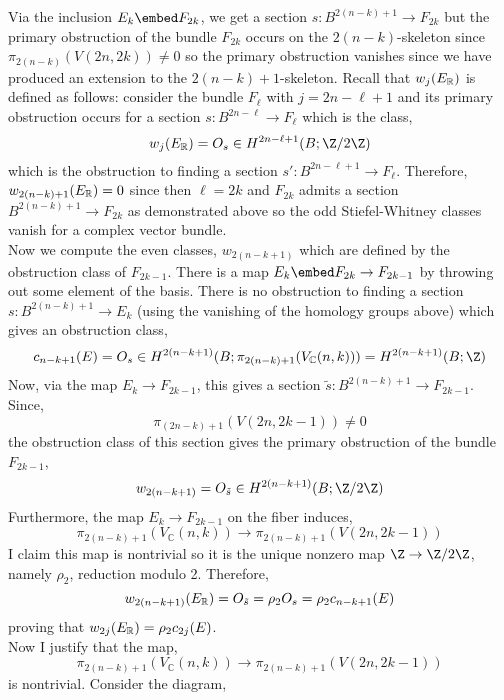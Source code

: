 \documentclass[12pt]{extarticle}
\newcommand{\C}{\mathbb{C}}
\begin{document}
Via the inclusion $E_k \embed F_{2k}$, we get a section $s : B^{2 (n - k) + 1} \to F_{2k}$ but the primary obstruction of the bundle $F_{2k}$ occurs on the $2(n - k)$-skeleton since $\pi_{2(n-k)}(V(2n, 2k)) \neq 0$ so the primary obstruction vanishes since we have produced an extension to the $2(n-k) + 1$-skeleton. Recall that $w_{j}(E_{\mathbb{R}})$ is defined as follows: consider the bundle $F_{\ell}$ with $j = 2n - \ell + 1$ and its primary obstruction occurs for a section $s : B^{2n-\ell} \to F_{\ell}$ which is the class,
\[ w_{j}(E_\R) = O_{s} \in H^{2n - \ell + 1}(B; \Z / 2 \Z) \]
which is the obstruction to finding a section $s' : B^{2n - \ell + 1} \to F_{\ell}$. Therefore, $w_{2(n - k) + 1}(E_{\mathbb{R}}) = 0$ since then $\ell = 2 k$ and $F_{2k}$ admits a section $B^{2(n - k) + 1} \to F_{2k}$ as demonstrated above so the odd Stiefel-Whitney classes vanish for a complex vector bundle.
\bigskip\\
Now we compute the even classes, $w_{2(n-k + 1)}$ which are defined by the obstruction class of $F_{2k - 1}$. There is a map $E_{k} \embed F_{2k} \to F_{2k - 1}$ by throwing out some element of the basis. There is no obstruction to finding a section $s : B^{2(n - k) + 1} \to E_k$ (using the vanishing of the homology groups above) which gives an obstruction class,
\[ c_{n-k+1}(E) = O_s \in H^{2(n - k + 1)}(B; \pi_{2(n-k) + 1}(V_\C(n, k))) = H^{2(n - k + 1)}(B; \Z) \]
Now, via the map $E_{k} \to F_{2k - 1}$, this gives a section $\tilde{s} : B^{2(n - k) + 1} \to F_{2k - 1}$. Since,
\[ \pi_{(2 n - k) + 1}(V(2n, 2k - 1)) \neq 0 \]
the obstruction class of this section gives the primary obstruction of the bundle $F_{2k - 1}$,
\[ w_{2(n - k + 1)} = O_{\tilde{s}} \in H^{2(n - k + 1)}(B; \Z / 2 \Z) \]
Furthermore, the map $E_k \to F_{2k - 1}$ on the fiber induces,
\[ \pi_{2(n - k) + 1}(V_\C(n, k)) \to \pi_{2(n - k) + 1}(V(2n, 2k - 1)) \]
I claim this map is nontrivial so it is the unique nonzero map $\Z \to \Z / 2 \Z$, namely $\rho_2$, reduction modulo 2. Therefore, 
\[ w_{2(n - k + 1)}(E_{\mathbb{R}}) = O_{\tilde{s}} = \rho_2 O_{s} = \rho_2 c_{n - k + 1}(E) \]
proving that $w_{2j}(E_{\mathbb{R}}) = \rho_2 c_{2j}(E)$. 
\bigskip\\
Now I justify that the map,
\[ \pi_{2(n - k) + 1}(V_\C(n, k)) \to \pi_{2(n - k) + 1}(V(2n, 2k - 1)) \]
is nontrivial. Consider the diagram,
\begin{center}
\end{center}
\end{document}
